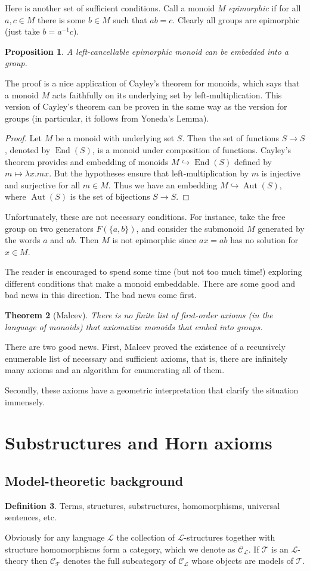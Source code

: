 \documentclass{article}
\theoremstyle{plain}
\newtheorem{thm}{Theorem}[section]
\newtheorem{prop}[thm]{Proposition}
\theoremstyle{definition}
\newtheorem{defn}[thm]{Definition}
\DeclareMathOperator{\End}{End}
\DeclareMathOperator{\Aut}{Aut}
\begin{document}
	Here is another set of sufficient conditions. Call a monoid $M$ \emph{epimorphic} if for all $a,c\in M$ there is some $b\in M$ such that $ab=c$. Clearly all groups are epimorphic (just take $b= a^{-1}c$).
	\begin{prop}
		A left-cancellable epimorphic monoid can be embedded into a group.
	\end{prop}
	The proof is a nice application of Cayley's theorem for monoids, which says that a monoid $M$ acts faithfully on its underlying set by left-multiplication. This version of Cayley's theorem can be proven in the same way as the version for groups (in particular, it follows from Yoneda's Lemma).
	\begin{proof}
		Let $M$ be a monoid with underlying set $S$. Then the set of functions $S\to S$, denoted by $\End(S)$, is a monoid under composition of functions. Cayley's theorem provides and embedding of monoids $M\hookrightarrow \End(S)$ defined by $m\mapsto \lambda x. mx$. But the hypotheses ensure that left-multiplication by $m$ is injective and surjective for all $m\in M$. Thus we have an embedding $M\hookrightarrow \Aut(S)$, where $\Aut(S)$ is the set of bijections $S\to S$.
	\end{proof}
	Unfortunately, these are not necessary conditions. For instance, take the free group on two generators $F(\{a,b\})$, and consider the submonoid $M$ generated by the words $a$ and $ab$. Then $M$ is not epimorphic since $ax=ab$ has no solution for $x\in M$.
	
	The reader is encouraged to spend some time (but not too much time!) exploring different conditions that make a monoid embeddable. There are some good and bad news in this direction. The bad news come first.
	\begin{thm}[Malcev]
		There is no finite list of first-order axioms (in the language of monoids) that axiomatize monoids that embed into groups.
	\end{thm}
	There are two good news. First, Malcev proved the existence of a recursively enumerable list of necessary and sufficient axioms, that is, there are infinitely many axioms and an algorithm for enumerating all of them.
	
	Secondly, these axioms have a geometric interpretation that clarify the situation immensely. 
	\section{Substructures and Horn axioms}
	\subsection{Model-theoretic background}
	\begin{defn}
		Terms, structures, substructures, homomorphisms, universal sentences, etc.
	\end{defn}
	Obviously for any language $\mathcal{L}$ the collection of $\mathcal{L}$-structures together with structure homomorphisms form a category, which we denote as $\mathcal{C}_{\mathcal{L}}$. If $\mathcal{T}$ is an $\mathcal{L}$-theory then $\mathcal{C}_\mathcal{T}$ denotes the full subcategory of $\mathcal{C}_{\mathcal{L}}$ whose objects are models of $\mathcal{T}$.
	
\end{document}
